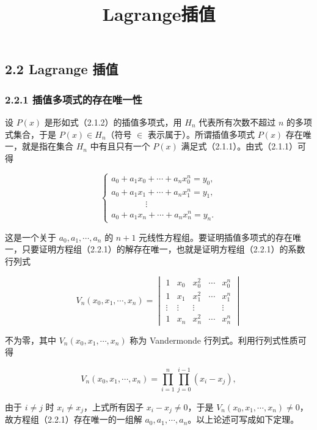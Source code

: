 \documentclass[
  10pt,
  fontset=fandol]{ctexart}
\title{Lagrange插值}
\author{}
\date{}
\begin{document}
\maketitle

\subsection{2.2 Lagrange 插值}\label{lagrange-ux63d2ux503c}

\subsubsection{2.2.1 插值多项式的存在唯一性}\label{ux63d2ux503cux591aux9879ux5f0fux7684ux5b58ux5728ux552fux4e00ux6027}

设 \(P(x)\) 是形如式（2.1.2）的插值多项式，用 \(H_n\) 代表所有次数不超过 \(n\) 的多项式集合，于是 \(P(x)\in H_n\)（符号 \(\in\) 表示属于）。所谓插值多项式 \(P(x)\) 存在唯一，就是指在集合 \(H_n\) 中有且只有一个 \(P(x)\) 满足式（2.1.1）。由式（2.1.1）可得

\[
\begin{cases}
a_0+a_1x_0+\cdots+a_nx_0^n=y_0,\\
a_0+a_1x_1+\cdots+a_nx_1^n=y_1,\\
\qquad\qquad\vdots\\
a_0+a_1x_n+\cdots+a_nx_n^n=y_n.
\end{cases}
\tag{2.2.1}
\]

这是一个关于 \(a_0,a_1,\cdots,a_n\) 的 \(n+1\) 元线性方程组。要证明插值多项式的存在唯一，只要证明方程组（2.2.1）的解存在唯一，也就是证明方程组（2.2.1）的系数行列式

\[
V_n(x_0,x_1,\cdots,x_n)=
\begin{vmatrix}
1 & x_0 & x_0^2 & \cdots & x_0^n\\
1 & x_1 & x_1^2 & \cdots & x_1^n\\
\vdots & \vdots & \vdots & & \vdots\\
1 & x_n & x_n^2 & \cdots & x_n^n
\end{vmatrix}
\tag{2.2.2}
\]

不为零，其中 \(V_n(x_0,x_1,\cdots,x_n)\) 称为 Vandermonde 行列式。利用行列式性质可得

\[
V_n(x_0,x_1,\cdots,x_n)
=\prod_{i=1}^{n}\prod_{j=0}^{i-1}(x_i-x_j),
\]

由于 \(i\ne j\) 时 \(x_i\ne x_j\)，上式所有因子 \(x_i-x_j\ne0\)，于是 \(V_n(x_0,x_1,\cdots,x_n)\ne0\)，故方程组（2.2.1）存在唯一的一组解 \(a_0,a_1,\cdots,a_n\)。以上论述可写成如下定理。
\end{document}

